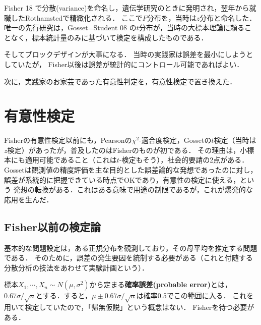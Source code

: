\documentclass[uplatex,dvipdfmx]{jsreport}
\begin{document}
\begin{history}
    Fisher 18 \cite{Fisher18}で分散(variance)を命名し，遺伝学研究のときに発明され，翌年から就職したRothamstedで精緻化される．
    ここで$F$分布を，当時は$z$分布と命名した．
    唯一の先行研究は，Gosset=Student 08 \cite{Gosset08}の$t$分布が，当時の大標本理論に頼ることなく，標本統計量のみに基づいて検定を構成したものである．
\end{history}

そしてブロックデザインが大事になる．
当時の実践家は誤差を最小にしようとしていたが，
Fisher以後は誤差が統計的にコントロール可能であればよい．

次に，実践家のお家芸であった有意性判定を，有意性検定で置き換えた．

\section{有意性検定}

\begin{tcolorbox}[colframe=ForestGreen, colback=ForestGreen!10!white,breakable,colbacktitle=ForestGreen!40!white,coltitle=black,fonttitle=\bfseries\sffamily,
title=]
    Fisherの有意性検定以前にも，Pearsonの$\chi^2$-適合度検定，Gossetの$t$検定（当時は$z$検定）があったが，普及したのはFisherのものが初である．
    その理由は，小標本にも適用可能であること（これは$t$-検定もそう），社会的要請の2点がある．
    Gossetは観測値の精度評価を主な目的とした誤差論的な発想であったのに対し，誤差が系統的に把握できている時点でOKであり，有意性の検定に使える，という
    発想の転換がある．これはある意味で用途の制限であるが，これが爆発的な応用を生んだ．
\end{tcolorbox}

\subsection{Fisher以前の検定論}

\begin{history}
    基本的な問題設定は，ある正規分布を観測しており，その母平均を推定する問題である．
    そのために，誤差の発生要因を統制する必要がある（これと付随する分散分析の技法をあわせて実験計画という）．

    標本$X_1,\cdots,X_n\sim N(\mu,\sigma^2)$から定まる\textbf{確率誤差(probable error)}とは，
    $0.67\sigma/\sqrt{n}$とする．すると，$\mu\pm0.67\sigma/\sqrt{n}$は確率0.5でこの範囲に入る．
    これを用いて検定していたので，「帰無仮説」という概念はない．
    Fisherを待つ必要がある．
\end{history}
\end{document}
